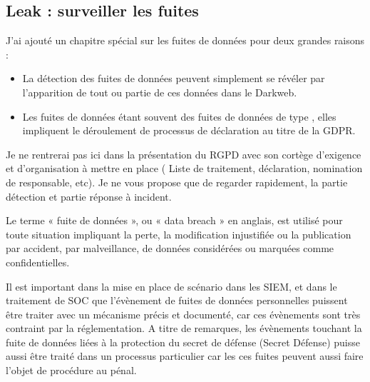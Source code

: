 


\subsection{Leak  : surveiller les fuites}

J'ai ajouté un chapitre spécial sur les fuites de données pour deux grandes raisons :

\begin{itemize}
  \item La détection des fuites de données peuvent simplement se révéler par l'apparition de tout ou partie de ces données dans le Darkweb. 
  \item Les fuites de données étant souvent des fuites de données de type , elles impliquent le déroulement de processus de déclaration au titre de la GDPR.
\end{itemize}


Je ne rentrerai pas ici dans la présentation du RGPD avec son cortège d'exigence et d'organisation à mettre en place (
Liste de traitement, déclaration, nomination de responsable, etc).
Je ne vous propose que de regarder rapidement, la partie détection et partie réponse à incident.

Le terme « fuite de données », ou « data breach » en anglais, est utilisé pour toute situation impliquant la perte, la modification injustifiée ou la publication par accident, par malveillance, de données considérées ou marquées comme confidentielles. 

Il est important dans la mise en place de scénario dans les SIEM, et dans le traitement de SOC que l'évènement de fuites de données personnelles puissent être traiter avec un mécanisme précis et documenté, car ces évènements sont très contraint par la réglementation.
A titre de remarques, les évènements touchant la fuite de données liées à la protection du secret de défense (Secret Défense) puisse aussi être traité dans un processus particulier car les ces fuites peuvent aussi faire l'objet de procédure au pénal.

